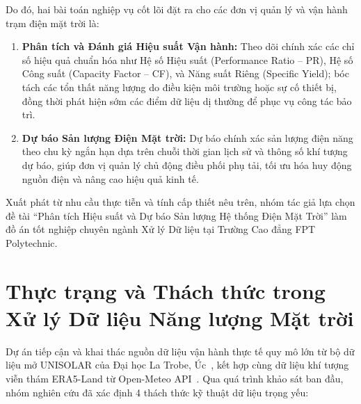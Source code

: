 \documentclass[12pt, a4paper]{report}
\begin{document}
Do đó, hai bài toán nghiệp vụ cốt lõi đặt ra cho các đơn vị quản lý và vận hành trạm điện mặt trời là:
\begin{enumerate}[noitemsep]
    \item \textbf{Phân tích và Đánh giá Hiệu suất Vận hành:} Theo dõi chính xác các chỉ số hiệu quả chuẩn hóa như Hệ số Hiệu suất (Performance Ratio -- PR), Hệ số Công suất (Capacity Factor -- CF), và Năng suất Riêng (Specific Yield); bóc tách các tổn thất năng lượng do điều kiện môi trường hoặc sự cố thiết bị, đồng thời phát hiện sớm các điểm dữ liệu dị thường để phục vụ công tác bảo trì.
    \item \textbf{Dự báo Sản lượng Điện Mặt trời:} Dự báo chính xác sản lượng điện năng theo chu kỳ ngắn hạn dựa trên chuỗi thời gian lịch sử và thông số khí tượng dự báo, giúp đơn vị quản lý chủ động điều phối phụ tải, tối ưu hóa huy động nguồn điện và nâng cao hiệu quả kinh tế.
\end{enumerate}

Xuất phát từ nhu cầu thực tiễn và tính cấp thiết nêu trên, nhóm tác giả lựa chọn đề tài ``Phân tích Hiệu suất và Dự báo Sản lượng Hệ thống Điện Mặt Trời'' làm đồ án tốt nghiệp chuyên ngành Xử lý Dữ liệu tại Trường Cao đẳng FPT Polytechnic.

\section{Thực trạng và Thách thức trong Xử lý Dữ liệu Năng lượng Mặt trời}
\label{sec:thuctrang_thachthuc}

Dự án tiếp cận và khai thác nguồn dữ liệu vận hành thực tế quy mô lớn từ bộ dữ liệu mở UNISOLAR của Đại học La Trobe, Úc~\cite{wimalaratne2022unisolar}, kết hợp cùng dữ liệu khí tượng viễn thám ERA5-Land từ Open-Meteo API~\cite{openmeteo2023}. Qua quá trình khảo sát ban đầu, nhóm nghiên cứu đã xác định 4 thách thức kỹ thuật dữ liệu trọng yếu:
\end{document}
